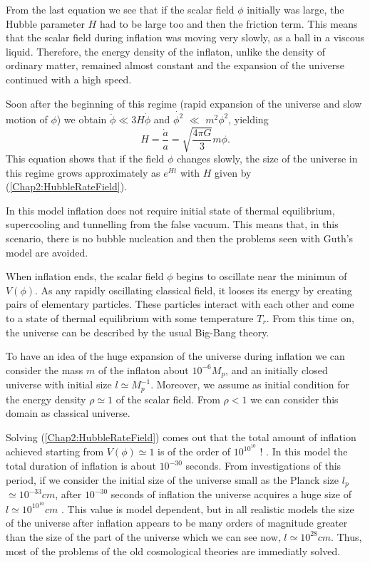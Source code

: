 \documentclass[11pt,a4paper,twoside]{book}
\begin{document}
From the last equation we see that if the scalar field $\phi$ initially was large, the Hubble parameter $ H $ had to be large too and then the friction term. This means that the scalar field during inflation was moving very slowly, as a ball in a viscous liquid. Therefore, the energy density of the inflaton, unlike the density of ordinary matter, remained almost constant and the expansion of the universe continued with a high speed. 

Soon after the beginning of this regime (rapid expansion of the universe and slow motion of $\phi$) we obtain $ \ddot{\phi} \ll 3H\dot{\phi} $ and $\dot{\phi^{2}}$ $\ll$ $ m^{2}\phi^{2} $, yielding
\begin{equation}
	\label{Chap2:HubbleRateField}
	H=\frac{\dot{a}}{a} =\sqrt{\frac{4\pi G}{3}}m\phi.
\end{equation}
 This equation shows that if the field $\phi$ changes slowly, the size of the universe in this regime grows approximately as $ e^{H t} $ with $ H $ given by (\ref{Chap2:HubbleRateField}). 
 
 In this model inflation does not require initial state of thermal equilibrium, supercooling and tunnelling from the false vacuum. This means that, in this scenario, there is no bubble nucleation and then the problems seen with Guth's model are avoided.
 
 When inflation ends, the scalar field $\phi$ begins to oscillate near the minimun of $ V(\phi) $. As any rapidly oscillating classical field, it looses its energy by creating pairs of elementary particles. These particles interact with each other and come to a state of thermal equilibrium with some temperature $ T_{r} $. From this time on, the universe can be described by the usual Big-Bang theory.
 
 To have an idea of the huge expansion of the universe during inflation we can consider the mass $ m $ of the inflaton about $ 10^{-6} M_{p} $, and an initially closed universe with initial size $ l \simeq M_{p}^{-1} $. Moreover, we assume as initial condition for the energy density $\rho \simeq 1$ of the scalar field. From $\rho < 1$ we can consider this domain as classical universe.
 
 Solving (\ref{Chap2:HubbleRateField}) comes out that the total amount of inflation achieved starting from $ V(\phi) \simeq 1 $ is of the order of $ 10^{10^{10}} $ ! . In this model the total duration of inflation is about $ 10^{-30} $ seconds. From investigations of this period, if we consider the initial size of the universe small as the Planck size $ l_{p} $ $\simeq 10^{-33} cm$, after $ 10^{-30} $ seconds of inflation the universe acquires a huge size of $ l \simeq 10^{10^{10}} cm $ \cite{Chap2:Linde_HystoryInflation}. This value is model dependent, but in all realistic models  the size of the universe after inflation appears to be many orders of magnitude greater than the size of the part of the universe which we can see now, $ l \simeq 10^{28} cm $. Thus, most of the problems of the old cosmological theories are immediatly solved. 
 
\end{document}
